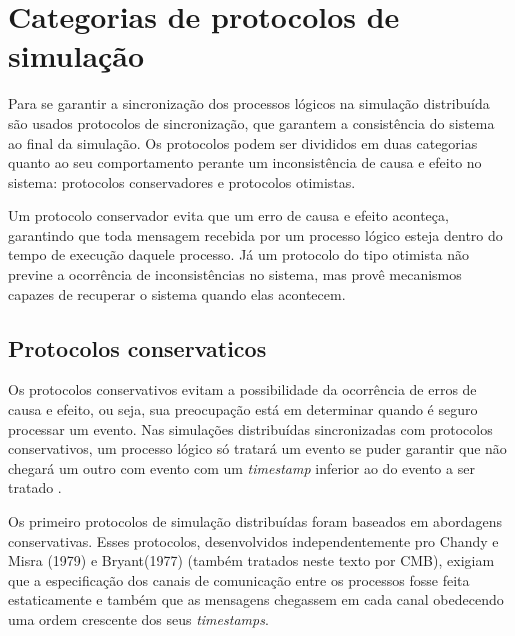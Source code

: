 \section{Categorias de protocolos de simulação}


Para se garantir a sincronização dos processos lógicos na simulação distribuída são usados protocolos de sincronização, que garantem a consistência do sistema ao final da simulação. Os protocolos podem ser divididos em duas categorias quanto ao seu comportamento perante um inconsistência de causa e efeito no sistema: protocolos conservadores e protocolos otimistas. 

Um protocolo conservador evita que um erro de causa e efeito aconteça, garantindo que toda mensagem recebida por um processo lógico esteja dentro do tempo de execução daquele processo. Já um protocolo do tipo otimista não previne a ocorrência de inconsistências no sistema, mas provê mecanismos capazes de recuperar o sistema quando elas acontecem.

\subsection{Protocolos conservaticos}


Os protocolos conservativos evitam a possibilidade da ocorrência de erros de causa e efeito, ou seja, sua preocupação está em determinar quando é seguro processar um evento. Nas simulações distribuídas sincronizadas com protocolos conservativos, um processo lógico só tratará um evento se puder garantir que não chegará um outro com evento com um \textit{timestamp} inferior ao do evento a ser tratado \cite{SRINIVASAN-REYNOLDS-1999}.


Os primeiro protocolos de simulação distribuídas foram baseados em abordagens conservativas. Esses protocolos, desenvolvidos independentemente pro Chandy e Misra (1979) e Bryant(1977) (também tratados neste texto por CMB), exigiam que a especificação dos canais de comunicação entre os processos fosse feita estaticamente e também que as mensagens chegassem em cada canal obedecendo uma ordem crescente dos seus \textit{timestamps}.

